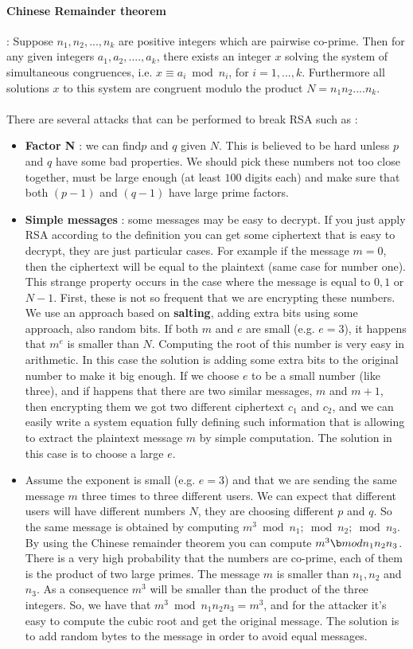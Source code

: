 \documentclass[11pt]{article}
\begin{document}
\paragraph{Chinese Remainder theorem} : Suppose $n_1, n_2, ..., n_k$ are positive integers which are pairwise co-prime. Then for any given integers $a_1, a_2, ...., a_k$, there exists an integer $x$ solving the system of simultaneous congruences, i.e. $x \equiv a_i \bmod n_i$, for $i = 1, ..., k$.
Furthermore all solutions $x$ to this system are congruent modulo the product $N = n_1 n_2 .... n_k$.\\\\There are several attacks that can be performed to break RSA such as : 
\begin{itemize}
\item \textbf{Factor N} : we can find$ p$ and $q$ given $N$. This is believed to be hard
unless $p$ and $q$ have some bad properties. We should pick these numbers not too close together, must be large enough (at least $100$ digits each) and make sure that both $(p - 1)$ and $(q - 1)$ have large prime factors.
\item \textbf{Simple messages} : some messages may be easy to decrypt. If you just apply RSA according to the definition you can get some ciphertext that is easy to decrypt, they are just particular cases. For example if the message $m = 0$, then the ciphertext will be equal to the plaintext (same case for number one). This strange property occurs in the case where the message is equal to $0, 1 $ or $N - 1$. First, these is not so frequent that we are encrypting these numbers. We use an approach based on \textbf{salting}, adding extra bits using some approach, also random bits. If both $m$ and $e$ are small (e.g. $e = 3$), it happens that $m^e$ is smaller than $N$. Computing the root of this number is very easy in arithmetic. In this case the solution is adding some extra bits to the original number to make it big enough. If we choose $e$ to be a small number (like three), and if happens that there are two similar messages, $m$ and $m + 1$, then encrypting them we got two different ciphertext $c_1$ and $c_2$, and we can easily write a system equation fully defining such information that is allowing to extract the plaintext message $m$ by simple computation. The solution in this case is to choose a large $e$.
\item Assume the exponent is small (e.g. $e = 3$) and that we are sending the same message $m$ three times to three different users. We can expect that different users will have different numbers $N$, they are choosing different $p$ and $q$. So the same message is obtained by computing $m^3 \bmod n_1; \bmod n_2; \bmod n_3$. By using the Chinese remainder theorem you can compute $m^3 \b mod n_1 n_2 n_3$. There is a very high probability that the numbers are co-prime, each of them is the product of two large primes. The message $m$ is smaller than $n_1, n_2$ and $n_3$. As a consequence $m^3$ will be smaller than the product of the three integers. So, we have that $m^3 \bmod n_1 n_2 n_3 = m^3$, and for the attacker it’s easy to compute the cubic root and get the original message. The solution is to add random bytes to the message in order to avoid equal messages.

\end{itemize}
\end{document}
